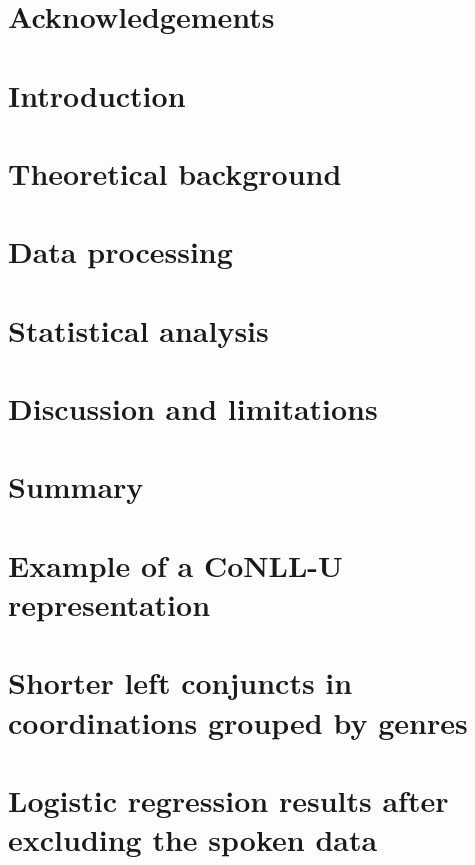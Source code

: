 \documentclass[12pt]{report}
\begin{document}
\chapter*{Acknowledgements}
    

\pagestyle{fancy}
\chapter{Introduction}\label{ch:introduction}
    
\chapter{Theoretical background}\label{ch:theory}
    
\chapter{Data processing}\label{ch:technical}
    
\chapter{Statistical analysis}\label{ch:stats}
    
\chapter{Discussion and limitations}\label{ch:discussion}
    
\chapter{Summary}
    

\appendix
\captionsetup{labelfont=bf}
\chapter{Example of a CoNLL-U representation}\label{ap:conllu}
    
\chapter{Shorter left conjuncts in coordinations grouped by genres}\label{ap:genres}
    
\chapter{Logistic regression results after excluding the spoken data}
    


\end{document}
